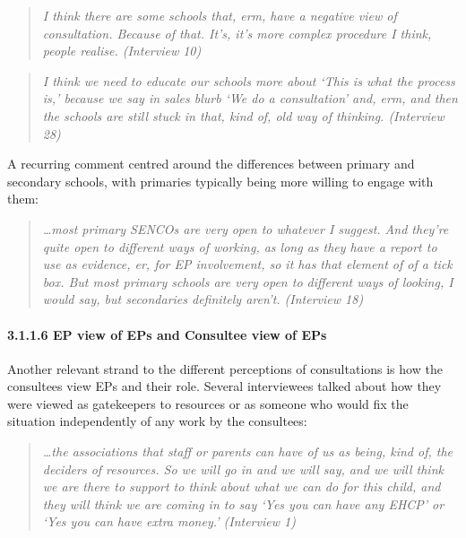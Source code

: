 \documentclass[
  english,
  man]{apa}
\let\oldparagraph\paragraph
\renewcommand{\paragraph}[1]{\oldparagraph{#1}\mbox{}}
\begin{document}
\begin{quote}
\emph{I think there are some schools that, erm, have a negative view of
consultation. Because of that. It's, it's more complex procedure I
think, people realise. (Interview 10)}
\end{quote}

\begin{quote}
\emph{I think we need to educate our schools more about `This is what the
process is,' because we say in sales blurb `We do a consultation' and,
erm, and then the schools are still stuck in that, kind of, old way of
thinking. (Interview 28)}
\end{quote}

A recurring comment centred around the differences between primary and secondary schools, with primaries typically being more willing to engage with them:

\begin{quote}
\emph{\ldots most primary SENCOs are very open to whatever I suggest. And they're
quite open to different ways of working, as long as they have a report
to use as evidence, er, for EP involvement, so it has that element of
of a tick box. But most primary schools are very open to different
ways of looking, I would say, but secondaries definitely aren't.
(Interview 18)}
\end{quote}

\hypertarget{ep-view-of-eps-and-consultee-view-of-eps}{%
\paragraph{3.1.1.6 EP view of EPs and Consultee view of EPs}\label{ep-view-of-eps-and-consultee-view-of-eps}}

Another relevant strand to the different perceptions of consultations is how the consultees view EPs and their role. Several interviewees talked about how they were viewed as gatekeepers to resources or as someone who would fix the situation independently of any work by the consultees:

\begin{quote}
\emph{\ldots the associations that staff or parents can have of us as being, kind
of, the deciders of resources. So we will go in and we will say, and
we will think we are there to support to think about what we can do
for this child, and they will think we are coming in to say `Yes you
can have any EHCP' or `Yes you can have extra money.' (Interview 1)}
\end{quote}
\end{document}
